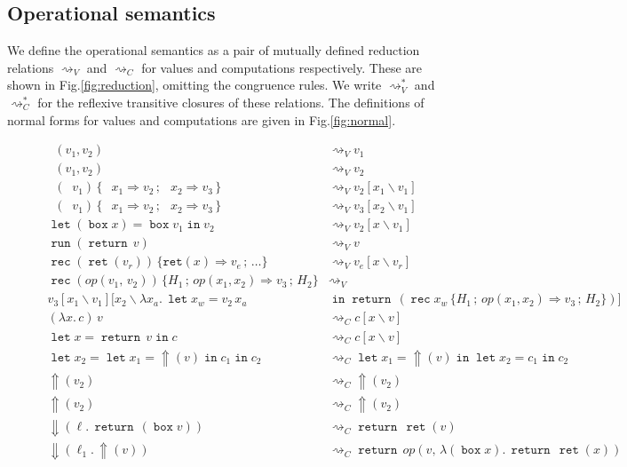 \documentclass[acmsmall, screen, review, anonymous]{acmart}
\theoremstyle{definition}
\newcommand{\reflectname}{\mathord{\Uparrow}}
\newcommand{\performraw}[2]{\mathop{\reflectname(#1(#2))}}
\newcommand{\perform}[3]{\performraw{#1}{#2}(#3)}
\newcommand{\reifyname}{\Downarrow}
\newcommand{\reify}[2]{\mathop{\reifyname}(#1.\,#2)}
\newcommand{\loc}{\ell}
\newcommand{\outlname}{\mathtt{out}_L}
\newcommand{\outl}[1]{\mathop{\outlname} #1}
\newcommand{\outrname}{\mathtt{out}_R}
\newcommand{\outr}[1]{\mathop{\outrname} #1}
\newcommand{\indintro}[3]{{#1}(#2,\, #3)}
\newcommand{\retname}{\mathtt{ret}}
\newcommand{\ret}[1]{\mathop{\retname}(#1)}
\newcommand{\indelimname}{\mathtt{rec}}
\newcommand{\indelim}[2]{\mathop{\indelimname} #1 \,\{#2\}}
\newcommand{\indretcase}[2]{\retname(#1) \Rightarrow #2}
\newcommand{\indcase}[4]{#1(#2, #3) \Rightarrow #4}
\newcommand{\seq}{\,;\,}
\newcommand{\fstname}{\mathop{\pi_1}}
\newcommand{\fst}[1]{\fstname #1}
\newcommand{\sndname}{\mathop{\pi_2}}
\newcommand{\snd}[1]{\sndname #1}
\newcommand{\inlname}{\mathop{\mathtt{in}_L}}
\newcommand{\inl}[1]{\inlname #1}
\newcommand{\inrname}{\mathop{\mathtt{in}_R}}
\newcommand{\inr}[1]{\inrname #1}
\newcommand{\casename}{\mathtt{case}}
\newcommand{\casemname}{\casename^{m}}
\newcommand{\casem}[5]{\mathop{\casemname} #1 \,\{\,\inl{#2} \Rightarrow #3 \seq \inr{#4} \Rightarrow #5 \,\}}
\newcommand{\abs}[2]{\lambda#1.\,#2}
\newcommand{\app}[2]{#1\,#2}
\newcommand{\returnname}{\mathop{\mathtt{return}}}
\newcommand{\return}[1]{\returnname\, #1}
\newcommand{\letvname}{\mathop{\mathtt{let}}}
\newcommand{\letv}[3]{\letvname #1 = #2 \mathop{\mathtt{in}} #3}
\newcommand{\gboxname}{\mathop{\mathtt{box}}}
\newcommand{\gbox}[1]{\gboxname #1}
\newcommand{\gunbox}[3]{\mathop{\mathtt{let}} (\gbox{#1}) = #2 \mathop{\mathtt{in}} #3}
\newcommand{\grunname}{\mathtt{run}}
\newcommand{\grun}[1]{\mathop{\grunname}(#1)}
\newcommand{\sub}[2]{[#1\backslash#2]}
\newcommand{\sbst}[3]{#1\sub{#2}{#3}}
\newcommand{\stepstoname}{\rightsquigarrow}
\newcommand{\stepstov}{\stepstoname_V}
\newcommand{\stepstoc}{\stepstoname_C}
\newcommand{\reducestoname}{\stepstoname^{*}}
\newcommand{\reducestov}{\reducestoname_{V}}
\newcommand{\reducestoc}{\reducestoname_{C}}
\begin{document}
\subsection{Operational semantics}
\label{sec:operational}

We define the operational semantics as a pair of mutually defined
reduction relations $\stepstov$ and $\stepstoc$ for values and
computations respectively. These are shown in Fig.\ref{fig:reduction},
omitting the congruence rules. We write $\reducestov$ and $\reducestoc$
for the reflexive transitive closures of these relations. The
definitions of normal forms for values and computations are given in
Fig.\ref{fig:normal}.

\begin{figure}
\begin{align*}
\fst{(v_1, v_2)} &\stepstov v_1 \\
\snd{(v_1, v_2)} &\stepstov v_2 \\
\casem{(\inl{v_1})}{x_1}{v_2}{x_2}{v_3} &\stepstov \sbst{v_2}{x_1}{v_1} \\
\casem{(\inr{v_1})}{x_1}{v_2}{x_2}{v_3} &\stepstov \sbst{v_3}{x_2}{v_1} \\
\gunbox{x}{\gbox{v_1}}{v_2} &\stepstov \sbst{v_2}{x}{v_1} \\
\grun{\return{v}} &\stepstov v \\
\indelim{(\ret{v_r})}{\indretcase{x}{v_e} \seq \ldots} &\stepstov \sbst{v_e}{x}{v_r} \\
\indelim{(\indintro{op}{v_1}{v_2})}{H_1 \seq \indcase{op}{x_1}{x_2}{v_3} \seq H_2} &\stepstov \\
  \sbst{\sbst{v_3}{x_1}{v_1}}{x_2}{\abs{x_a}{\letv{x_w}{\app{v_2}{x_a}&}{\return{(\indelim{x_w}{H_1 \seq \indcase{op}{x_1}{x_2}{v_3} \seq H_2})}}}} \\
\app{(\abs{x}{c})}{v} &\stepstoc \sbst{c}{x}{v} \\
\letv{x}{\return{v}}{c} &\stepstoc \sbst{c}{x}{v} \\
\letv{x_2}{\letv{x_1}{\perform{\loc}{op}{v}}{c_1}}{c_2} &\stepstoc \letv{x_1}{\perform{\loc}{op}{v}}{\letv{x_2}{c_1}{c_2}} \\
\perform{(\outl{v_1})}{op}{v_2} &\stepstoc \perform{v_1}{\mathrm{left}(op)}{v_2} \\
\perform{(\outr{v_1})}{op}{v_2} &\stepstoc \perform{v_1}{\mathrm{right}(op)}{v_2} \\
\reify{\loc}{\return{(\gbox{v})}} &\stepstoc \return{\ret{v}} \\
\reify{\loc_1}{\perform{\loc_1}{op}{v}} &\stepstoc \return{\indintro{op}{v}{\abs{(\gbox{x})}{\return{\ret{x}}}}} \\

\end{align*}
\end{figure}
\end{document}
